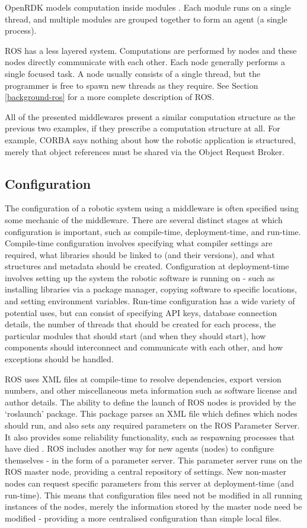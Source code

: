 \documentclass[../dissertation.tex]{subfiles}
\begin{document}
OpenRDK models computation inside modules \cite{OpenRDKIntro}. Each module runs on a single thread, and multiple modules are grouped together to form an agent (a single process).

ROS has a less layered system. Computations are performed by nodes and these nodes directly communicate with each other. Each node generally performs a single focused task. A node usually consists of a single thread, but the programmer is free to spawn new threads as they require. See Section \ref{background-ros} for a more complete description of ROS.

All of the presented middlewares present a similar computation structure as the previous two examples, if they prescribe a computation structure at all. For example, CORBA says nothing about how the robotic application is structured, merely that object references must be shared via the Object Request Broker.

\subsection{Configuration}

The configuration of a robotic system using a middleware is often specified using some mechanic of the middleware. There are several distinct stages at which configuration is important, such as compile-time, deployment-time, and run-time. Compile-time configuration involves specifying what compiler settings are required, what libraries should be linked to (and their versions), and what structures and metadata should be created. Configuration at deployment-time involves setting up the system the robotic software is running on - such as installing libraries via a package manager, copying software to specific locations, and setting environment variables. Run-time configuration has a wide variety of potential uses, but can consist of specifying API keys, database connection details, the number of threads that should be created for each process, the particular modules that should start (and when they should start), how components should interconnect and communicate with each other, and how exceptions should be handled.

ROS uses XML files at compile-time to resolve dependencies, export version numbers, and other miscellaneous meta information such as software license and author details. The ability to define the launch of ROS nodes is provided by the `roslaunch' package. This package parses an XML file which defines which nodes should run, and also sets any required parameters on the ROS Parameter Server. It also provides some reliability functionality, such as respawning processes that have died \cite{roslaunchPage}. ROS includes another way for new agents (nodes) to configure themselves - in the form of a parameter server. This parameter server runs on the ROS master node, providing a central repository of settings. New non-master nodes can request specific parameters from this server at deployment-time (and run-time). This means that configuration files need not be modified in all running instances of the nodes, merely the information stored by the master node need be modified - providing a more centralised configuration than simple local files.
\end{document}
